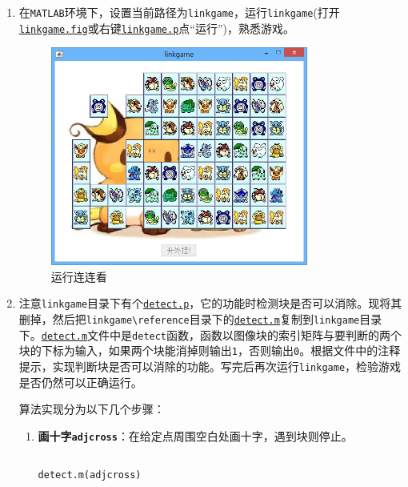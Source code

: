 \documentclass{article}
\numberwithin{figure}{section}
\numberwithin{table}{section}
\numberwithin{listing}{section}
\numberwithin{equation}{section}
\begin{document}
        \begin{enumerate}
            \item 在\texttt{MATLAB}环境下，设置当前路径为\texttt{linkgame}，运行\texttt{linkgame}(打开\href{../linkgame/linkgame.fig}{\texttt{linkgame.fig}}或右键\href{../linkgame/linkgame.p}{\texttt{linkgame.p}}点“运行”)，熟悉游戏。

                \begin{figure}[H]
                    \centering
                    \includegraphics[width=0.8\textwidth]{run_linkgame}
                    \caption{运行连连看}
                \end{figure}

            \item 注意\texttt{linkgame}目录下有个\href{../linkgame/detect.p}{\texttt{detect.p}}，它的功能时检测块是否可以消除。现将其删掉，然后把\texttt{linkgame\textbackslash reference}目录下的\href{../linkgame/reference/detect.m}{\texttt{detect.m}}复制到\texttt{linkgame}目录下。\href{../linkgame/detect.m}{\texttt{detect.m}}文件中是\texttt{detect}函数，函数以图像块的索引矩阵与要判断的两个块的下标为输入，如果两个块能消掉则输出\texttt{1}，否则输出\texttt{0}。根据文件中的注释提示，实现判断块是否可以消除的功能。写完后再次运行\texttt{linkgame}，检验游戏是否仍然可以正确运行。

                算法实现分为以下几个步骤：

                \begin{enumerate}
                    \item \textbf{画十字\texttt{adjcross}}：在给定点周围空白处画十字，遇到块则停止。

                        \begin{listing}[H]
                            \inputminted[firstline=39, lastline=58]{matlab}{../linkgame/detect.m}
                            \caption{\texttt{detect.m(adjcross)}}
                        \end{listing}


\end{enumerate}
\end{enumerate}
\end{document}
